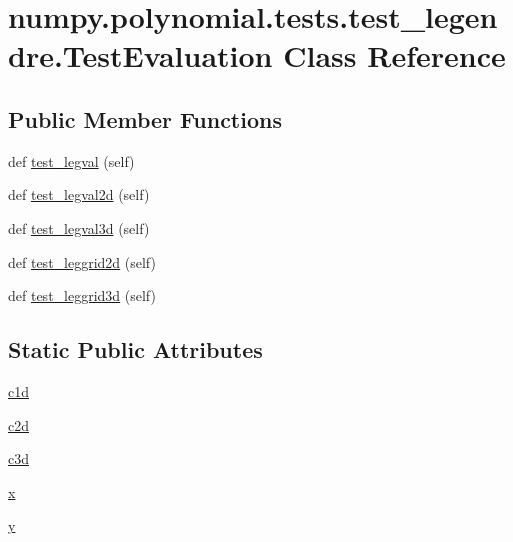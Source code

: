 \hypertarget{classnumpy_1_1polynomial_1_1tests_1_1test__legendre_1_1TestEvaluation}{}\section{numpy.\+polynomial.\+tests.\+test\+\_\+legendre.\+Test\+Evaluation Class Reference}
\label{classnumpy_1_1polynomial_1_1tests_1_1test__legendre_1_1TestEvaluation}
\subsection*{Public Member Functions}
\begin{DoxyCompactItemize}
\item 
def \hyperlink{classnumpy_1_1polynomial_1_1tests_1_1test__legendre_1_1TestEvaluation_a1247cb0fab616722d729a9dd2717baa1}{test\+\_\+legval} (self)
\item 
def \hyperlink{classnumpy_1_1polynomial_1_1tests_1_1test__legendre_1_1TestEvaluation_ae5013f3d69adafea676298b0590a844a}{test\+\_\+legval2d} (self)
\item 
def \hyperlink{classnumpy_1_1polynomial_1_1tests_1_1test__legendre_1_1TestEvaluation_ad86718d7e4c92f069db487a478977697}{test\+\_\+legval3d} (self)
\item 
def \hyperlink{classnumpy_1_1polynomial_1_1tests_1_1test__legendre_1_1TestEvaluation_a606798962b22936903cfdeadf42d288c}{test\+\_\+leggrid2d} (self)
\item 
def \hyperlink{classnumpy_1_1polynomial_1_1tests_1_1test__legendre_1_1TestEvaluation_a8faca363006d8be3c640fe01b7f071bf}{test\+\_\+leggrid3d} (self)
\end{DoxyCompactItemize}
\subsection*{Static Public Attributes}
\begin{DoxyCompactItemize}
\item 
\hyperlink{classnumpy_1_1polynomial_1_1tests_1_1test__legendre_1_1TestEvaluation_ab96ae1a0495cd85db49ccfceb2f14e0e}{c1d}
\item 
\hyperlink{classnumpy_1_1polynomial_1_1tests_1_1test__legendre_1_1TestEvaluation_abe9bb5c405c66d43abfaba6543f6155e}{c2d}
\item 
\hyperlink{classnumpy_1_1polynomial_1_1tests_1_1test__legendre_1_1TestEvaluation_a6fa9728f080713221bbfef5b5bdd43c8}{c3d}
\item 
\hyperlink{classnumpy_1_1polynomial_1_1tests_1_1test__legendre_1_1TestEvaluation_a614651430f1849cceea5e42dc9e80f62}{x}
\item 
\hyperlink{classnumpy_1_1polynomial_1_1tests_1_1test__legendre_1_1TestEvaluation_a196b3e0aa7c56f2b6fb326e5c459c2a0}{y}
\end{DoxyCompactItemize}


